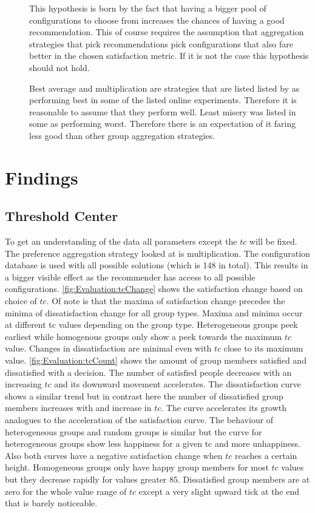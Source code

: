 \begin{description}
    \item[] This hypothesis is born by the fact that having a bigger pool of configurations to choose from increases the chances of having a good recommendation. This of course requires the assumption that aggregation strategies that pick recommendations pick configurations that also fare better in the chosen satisfaction metric. If it is not the case this hypothesis should not hold.  
    \item[] Best average and multiplication are strategies that are listed listed by \citeauthor{Masthoff2015} \cite[p. 755f]{Masthoff2015} as performing best in some of the listed online experiments. Therefore it is reasonable to assume that they perform well. Least misery was listed in some as performing worst. Therefore there is an expectation of it faring less good than other group aggregation strategies.
\end{description}

\section{Findings}
\label{sec:Evaluation:Findings}

\subsection{Threshold Center}

To get an understanding of the data all parameters except the $tc$ will be fixed. The preference aggregation strategy looked at is multiplication. The configuration database is used with all possible solutions (which is 148 in total). This results in a bigger visible effect as the recommender has access to all possible configurations. \autoref{fig:Evaluation:tcChange} shows the satisfaction change based on choice of $tc$. Of note is that the maxima of satisfaction change precedes the minima of dissatisfaction change for all group types. Maxima and minima occur at different tc values depending on the group type. Heterogeneous groups peek earliest while homogenous groups only show a peek towards the maximum $tc$ value. Changes in dissatisfaction are minimal even with $tc$ close to its maximum value. \autoref{fig:Evaluation:tcCount} shows the amount of group members satisfied and dissatisfied with a decision. The number of satisfied people decreases with an increasing $tc$ and its downward movement accelerates. The dissatisfaction curve shows a similar trend but in contrast here the number of dissatisfied group members increases with and increase in $tc$. The curve accelerates its growth analogues to the acceleration of the satisfaction curve. The behaviour of heterogeneous groups and random groups is similar but the curve for heterogeneous groups show less happiness for a given tc and more unhappiness. Also both curves have a negative satisfaction change when $tc$ reaches a certain height. Homogeneous groups only have happy group members for most $tc$ values but they decrease rapidly for values greater $85$. Dissatisfied group members are at zero for the whole value range of $tc$ except a very slight upward tick at the end that is barely noticeable.

